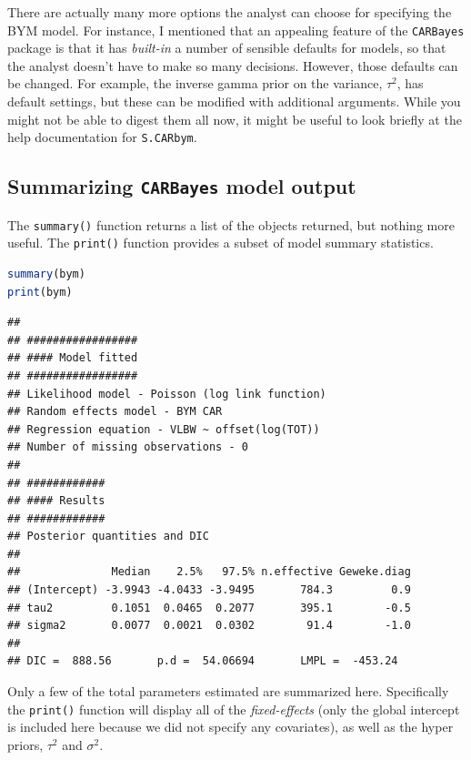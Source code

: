\documentclass[
]{book}
\newcommand{\passthrough}[1]{#1}
\begin{document}
There are actually many more options the analyst can choose for specifying the BYM model. For instance, I mentioned that an appealing feature of the \passthrough{\lstinline!CARBayes!} package is that it has \emph{built-in} a number of sensible defaults for models, so that the analyst doesn't have to make so many decisions. However, those defaults can be changed. For example, the inverse gamma prior on the variance, \(\tau^2\), has default settings, but these can be modified with additional arguments. While you might not be able to digest them all now, it might be useful to look briefly at the help documentation for \passthrough{\lstinline!S.CARbym!}.

\hypertarget{summarizing-carbayes-model-output}{%
\subsection{\texorpdfstring{Summarizing \texttt{CARBayes} model output}{Summarizing CARBayes model output}}\label{summarizing-carbayes-model-output}}

The \passthrough{\lstinline!summary()!} function returns a list of the objects returned, but nothing more useful. The \passthrough{\lstinline!print()!} function provides a subset of model summary statistics.

\begin{lstlisting}[language=R]
summary(bym)
print(bym)
\end{lstlisting}

\begin{lstlisting}
## 
## #################
## #### Model fitted
## #################
## Likelihood model - Poisson (log link function) 
## Random effects model - BYM CAR
## Regression equation - VLBW ~ offset(log(TOT))
## Number of missing observations - 0
## 
## ############
## #### Results
## ############
## Posterior quantities and DIC
## 
##              Median    2.5%   97.5% n.effective Geweke.diag
## (Intercept) -3.9943 -4.0433 -3.9495       784.3         0.9
## tau2         0.1051  0.0465  0.2077       395.1        -0.5
## sigma2       0.0077  0.0021  0.0302        91.4        -1.0
## 
## DIC =  888.56       p.d =  54.06694       LMPL =  -453.24
\end{lstlisting}

Only a few of the total parameters estimated are summarized here. Specifically the \passthrough{\lstinline!print()!} function will display all of the \emph{fixed-effects} (only the global intercept is included here because we did not specify any covariates), as well as the hyper priors, \(\tau^2\) and \(\sigma^2\).
\end{document}
